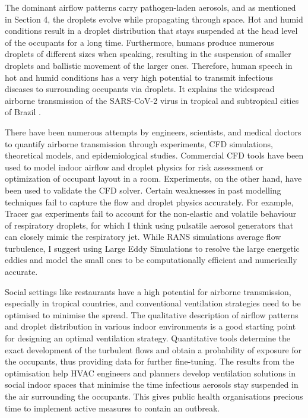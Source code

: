 \documentclass[a4paper,12pt]{elsarticle}
\begin{document}
The dominant airflow patterns carry pathogen-laden aerosols, and as mentioned in Section 4, the droplets evolve while propagating through space. Hot and humid conditions result in a droplet distribution that stays suspended at the head level of the occupants for a long time. Furthermore, humans produce numerous droplets of different sizes when speaking, resulting in the suspension of smaller droplets and ballistic movement of the larger ones. Therefore, human speech in hot and humid conditions has a very high potential to transmit infectious diseases to surrounding occupants via droplets. It explains the widespread airborne transmission of the SARS-CoV-2 virus in tropical and subtropical cities of Brazil \cite{prata2020temperature}. 

There have been numerous attempts by engineers, scientists, and medical doctors to quantify airborne transmission through experiments, CFD simulations, theoretical models, and epidemiological studies. Commercial CFD tools have been used to model indoor airflow and droplet physics for risk assessment or optimization of occupant layout in a room. Experiments, on the other hand, have been used to validate the CFD solver. Certain weaknesses in past modelling techniques fail to capture the flow and droplet physics accurately. For example, Tracer gas experiments fail to account for the non-elastic and volatile behaviour of respiratory droplets, for which I think using pulsatile aerosol generators that can closely mimic the respiratory jet. While RANS simulations average flow turbulence, I suggest using Large Eddy Simulations to resolve the large energetic eddies and model the small ones to be computationally efficient and numerically accurate.

Social settings like restaurants have a high potential for airborne transmission, especially in tropical countries, and conventional ventilation strategies need to be optimised to minimise the spread. The qualitative description of airflow patterns and droplet distribution in various indoor environments is a good starting point for designing an optimal ventilation strategy. Quantitative tools determine the exact development of the turbulent flows and obtain a probability of exposure for the occupants, thus providing data for further fine-tuning. The results from the optimisation help HVAC engineers and planners develop ventilation solutions in social indoor spaces that minimise the time infectious aerosols stay suspended in the air surrounding the occupants. This gives public health organisations precious time to implement active measures to contain an outbreak.
\end{document}
